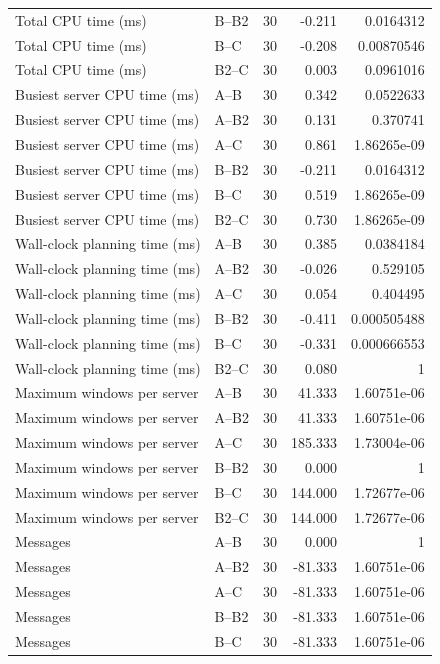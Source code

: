 \begin{table}[t]
\begin{tabular}{llrrr}
Total CPU time (ms) & B--B2 & 30 & -0.211 & 0.0164312 \\
Total CPU time (ms) & B--C & 30 & -0.208 & 0.00870546 \\
Total CPU time (ms) & B2--C & 30 & 0.003 & 0.0961016 \\
Busiest server CPU time (ms) & A--B & 30 & 0.342 & 0.0522633 \\
Busiest server CPU time (ms) & A--B2 & 30 & 0.131 & 0.370741 \\
Busiest server CPU time (ms) & A--C & 30 & 0.861 & 1.86265e-09 \\
Busiest server CPU time (ms) & B--B2 & 30 & -0.211 & 0.0164312 \\
Busiest server CPU time (ms) & B--C & 30 & 0.519 & 1.86265e-09 \\
Busiest server CPU time (ms) & B2--C & 30 & 0.730 & 1.86265e-09 \\
Wall-clock planning time (ms) & A--B & 30 & 0.385 & 0.0384184 \\
Wall-clock planning time (ms) & A--B2 & 30 & -0.026 & 0.529105 \\
Wall-clock planning time (ms) & A--C & 30 & 0.054 & 0.404495 \\
Wall-clock planning time (ms) & B--B2 & 30 & -0.411 & 0.000505488 \\
Wall-clock planning time (ms) & B--C & 30 & -0.331 & 0.000666553 \\
Wall-clock planning time (ms) & B2--C & 30 & 0.080 & 1 \\
Maximum windows per server & A--B & 30 & 41.333 & 1.60751e-06 \\
Maximum windows per server & A--B2 & 30 & 41.333 & 1.60751e-06 \\
Maximum windows per server & A--C & 30 & 185.333 & 1.73004e-06 \\
Maximum windows per server & B--B2 & 30 & 0.000 & 1 \\
Maximum windows per server & B--C & 30 & 144.000 & 1.72677e-06 \\
Maximum windows per server & B2--C & 30 & 144.000 & 1.72677e-06 \\
Messages & A--B & 30 & 0.000 & 1 \\
Messages & A--B2 & 30 & -81.333 & 1.60751e-06 \\
Messages & A--C & 30 & -81.333 & 1.60751e-06 \\
Messages & B--B2 & 30 & -81.333 & 1.60751e-06 \\
Messages & B--C & 30 & -81.333 & 1.60751e-06 \\

\end{tabular}
\end{table}
